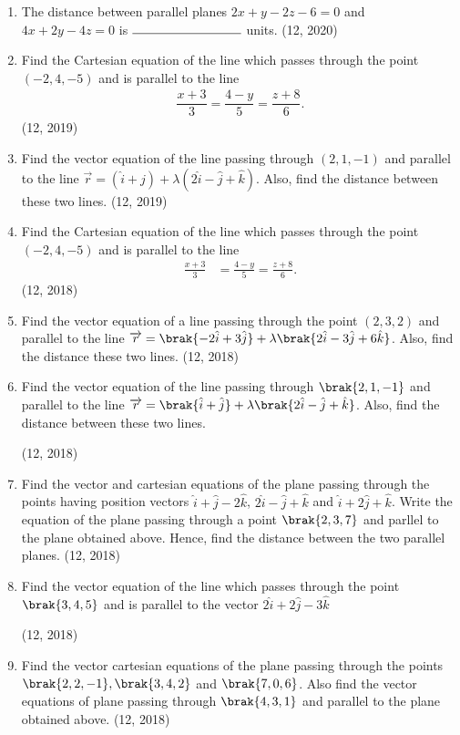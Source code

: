 \begin{enumerate}[label=\thesubsection.\arabic*, ref=\thesubsection.\theenumi]
\item The distance between parallel planes $2x + y - 2z - 6 = 0$ and $4x + 2y - 4z = 0$ is $\rule{3cm}{0.15mm}$ units.
\hfill (12, 2020)
	\item Find the Cartesian equation of the line which passes through the point $(-2, 4, -5)$ and is parallel to the line
	\begin{align*}
	\dfrac{x+3}{3} = \dfrac{4-y}{5} = \dfrac{z+8}{6}.
	\end{align*} \hfill (12, 2019)
	\item Find the vector equation of the line passing through $(2, 1, -1)$ and parallel to the line $\overrightarrow{r} = (\hat{i} + \hat{j}) + \lambda (2\hat{i} - \hat{j} + \hat{k})$. Also, find the distance between these two lines. \hfill (12, 2019)
\item Find the Cartesian equation of the line which passes through the point $(-2, 4, -5)$ and is parallel to the line 
\begin{align*}
\frac{x + 3}{3} &= \frac{4 - y}{5} = \frac{z + 8}{6}.
\end{align*}
\hfill (12, 2018)
\item Find the vector equation of a line passing through the point $(2,3,2)$ and parallel to the line $\overrightarrow{r} = \brak{-2\hat{i}+3\hat{j}}+\lambda\brak{2\hat{i}-3\hat{j}+6\hat{k}}$. Also, find the distance these two lines.
\hfill (12, 2018) 
\item  Find the vector equation of the line passing through $\brak{2, 1, -1}$ and parallel to the line $\overrightarrow{r}=\brak{\hat{i}+\hat{j}}+\lambda\brak{2\hat{i}-\hat{j}+\hat{k}}$. Also, find the distance between these two lines.

\hfill (12, 2018) 
\item Find the vector and cartesian equations of the plane passing through the points having position vectors $\hat{i} + \hat{ j} - 2\hat{k}$, $2\hat{i}-\hat{j} + \hat{k}$ and $\hat{i} + 2\hat{j} + \hat{k}$. Write the equation of the plane passing through a point $\brak{2,3,7}$ and parllel to the plane obtained above. Hence, find the distance between the two parallel planes.
\hfill (12, 2018) 
\item Find the vector equation of the line which passes through the point $\brak{3,4,5}$ and is parallel to the vector $2\hat{i}+2\hat{j}-3\hat{k}$

\hfill (12, 2018) 
\item Find the vector cartesian equations of the plane passing through the points $\brak{2,2,-1},\brak{3,4,2}$ and $\brak{7,0,6}$. Also find the vector equations of plane passing through $\brak{4,3,1}$ and parallel to the plane obtained above.
\hfill (12, 2018) 
\end{enumerate}
